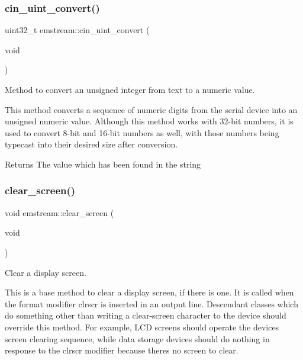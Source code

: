 \subsubsection{\texorpdfstring{cin\+\_\+uint\+\_\+convert()}{cin\_uint\_convert()}}
{\footnotesize\ttfamily uint32\+\_\+t emstream\+::cin\+\_\+uint\+\_\+convert (\begin{DoxyParamCaption}\item[{void}]{ }\end{DoxyParamCaption})\hspace{0.3cm}{\ttfamily [protected]}}



Method to convert an unsigned integer from text to a numeric value. 

This method converts a sequence of numeric digits from the serial device into an unsigned numeric value. Although this method works with 32-\/bit numbers, it is used to convert 8-\/bit and 16-\/bit numbers as well, with those numbers being typecast into their desired size after conversion. \begin{DoxyReturn}{Returns}
The value which has been found in the string 
\end{DoxyReturn}
\mbox{\label{classemstream_a8dcff85fe80c250b20b5da78b1799ed5}} 
\subsubsection{\texorpdfstring{clear\+\_\+screen()}{clear\_screen()}}
{\footnotesize\ttfamily void emstream\+::clear\+\_\+screen (\begin{DoxyParamCaption}\item[{void}]{ }\end{DoxyParamCaption})\hspace{0.3cm}{\ttfamily [virtual]}}



Clear a display screen. 

This is a base method to clear a display screen, if there is one. It is called when the format modifier {\ttfamily clrscr} is inserted in an output line. Descendant classes which do something other than writing a clear-\/screen character to the device should override this method. For example, L\+CD screens should operate the device\textquotesingle{}s screen clearing sequence, while data storage devices should do nothing in response to the {\ttfamily clrscr} modifier because there\textquotesingle{}s no screen to clear. \mbox{\label{classemstream_a41f0814540d5baa7312310c59077a248}} 
